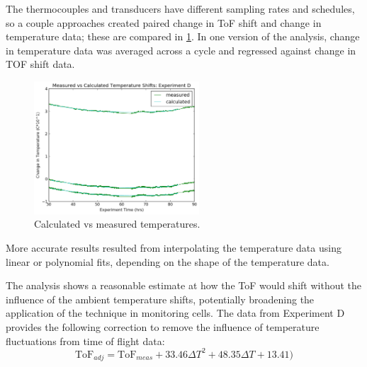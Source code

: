 The thermocouples and transducers have different sampling rates and schedules, so a couple approaches created paired change in ToF shift and change in temperature data; these are compared in \hyperref[fig:0417temp]{\cref{fig:0417temp}}. 
In one version of the analysis, change in temperature data was averaged across a cycle and regressed against change in TOF shift data. 
\begin{figure}[t]\label{fig:0417temp}
    \includegraphics[width=0.55\textwidth]{0417temp.png}
    \centering
    \caption{Calculated vs measured temperatures.}
\end{figure}
More accurate results resulted from interpolating the temperature data using linear or polynomial fits, depending on the shape of the temperature data.

The analysis shows a reasonable estimate at how the ToF would shift without the influence of the ambient temperature shifts, potentially broadening the application of the technique in monitoring cells. The data from Experiment D provides the following correction to remove the influence of temperature fluctuations from time of flight data:
$$ \text{ToF}_{adj} = \text{ToF}_{meas} + 33.46\Delta T^2 + 48.35\Delta T + 13.41)$$

